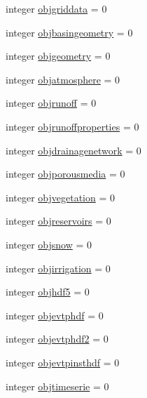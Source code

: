 \begin{DoxyCompactItemize}
\item 
integer \mbox{\hyperlink{structmodulebasin_1_1t__basin_ab3f0ecad06ba3b01f396fdfc4aeb1f3f}{objgriddata}} = 0
\item 
integer \mbox{\hyperlink{structmodulebasin_1_1t__basin_ad41fbd5a038dd3f663ce45f1b0e7c11c}{objbasingeometry}} = 0
\item 
integer \mbox{\hyperlink{structmodulebasin_1_1t__basin_a0f25325ffa5f909c322b5483154b046f}{objgeometry}} = 0
\item 
integer \mbox{\hyperlink{structmodulebasin_1_1t__basin_ad2cf3e223525c67df425f4ada461b792}{objatmosphere}} = 0
\item 
integer \mbox{\hyperlink{structmodulebasin_1_1t__basin_af3a6d003bab9603000254e42a737ce90}{objrunoff}} = 0
\item 
integer \mbox{\hyperlink{structmodulebasin_1_1t__basin_a76b3b3b710501e381a528b6d50c1e0d7}{objrunoffproperties}} = 0
\item 
integer \mbox{\hyperlink{structmodulebasin_1_1t__basin_a50f283539314113a11b53fae4b4b1d87}{objdrainagenetwork}} = 0
\item 
integer \mbox{\hyperlink{structmodulebasin_1_1t__basin_ad0ac66c717b3dcb8596976e85e4601a8}{objporousmedia}} = 0
\item 
integer \mbox{\hyperlink{structmodulebasin_1_1t__basin_a23e16bc0390b3674cdd71ced2594cd37}{objvegetation}} = 0
\item 
integer \mbox{\hyperlink{structmodulebasin_1_1t__basin_a65985bea937c23f2c5216b35b45b593e}{objreservoirs}} = 0
\item 
integer \mbox{\hyperlink{structmodulebasin_1_1t__basin_a3e5f7719bf1991980eac6ec61ffdff23}{objsnow}} = 0
\item 
integer \mbox{\hyperlink{structmodulebasin_1_1t__basin_a4905c8813ce4d21b65fdcac44d2a35d1}{objirrigation}} = 0
\item 
integer \mbox{\hyperlink{structmodulebasin_1_1t__basin_a3d6cc63c8bca06909246d36068b3b77c}{objhdf5}} = 0
\item 
integer \mbox{\hyperlink{structmodulebasin_1_1t__basin_aa7dc063ba247e09ecd98972a883be127}{objevtphdf}} = 0
\item 
integer \mbox{\hyperlink{structmodulebasin_1_1t__basin_aafac9a928df73afd6ad050b41efd07d4}{objevtphdf2}} = 0
\item 
integer \mbox{\hyperlink{structmodulebasin_1_1t__basin_ae06741bef4e9faf8ae6b17632bb4351d}{objevtpinsthdf}} = 0
\item 
integer \mbox{\hyperlink{structmodulebasin_1_1t__basin_ab2758fda2802d3fd1850ef825b431bc8}{objtimeserie}} = 0

\end{DoxyCompactItemize}
